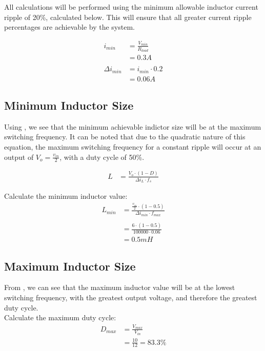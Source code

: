 All calculations will be performed using the minimum allowable inductor current ripple of 20\%, calculated below. This will ensure that all greater current ripple percentages are achievable by the system.

\begin{align}
    i_{min} &= \frac{V_{min}}{R_{load}}\\
    &= 0.3A \nonumber\\
    \\\nonumber
    \Delta i_{min} &= i_{min} \cdot 0.2\\
    &= 0.06A \nonumber 
\end{align}

\subsection*{Minimum Inductor Size}

Using , we see that the minimum achievable indictor size will be at the maximum switching frequency. It can be noted that due to the quadratic nature of this equation, the maximum switching frequency for a constant ripple will occur at an output of $V_{o} = \frac{v_{in}}{2}$, with a duty cycle of 50\%.

\begin{align} \label{A:inductor_equation}
    L &= \frac{ V_{o} \cdot \left( 1 - D \right) } {\Delta i_L \cdot f_s} 
\end{align} 

Calculate the minimum inductor value:
\begin{align}
    L_{min} &= \frac{ \frac{v_{in}}{2} \cdot \left( 1 - 0.5 \right) } {\Delta i_{min} \cdot f_{max}}\\\nonumber
    \\ \nonumber
    &= \frac{6 \cdot (1 - 0.5)}{100000 \cdot 0.06}\\ \nonumber
    &= 0.5mH
\end{align}


\subsection*{Maximum Inductor Size}

From , we can see that the maximum inductor value will be at the lowest switching frequency, with the greatest output voltage, and therefore the greatest duty cycle.\\

Calculate the maximum duty cycle:
\begin{align}
    D_{max} &= \frac{V_{max}}{V_{in}}\\
    &= \frac{10}{12} = 83.3\% \nonumber
\end{align}

